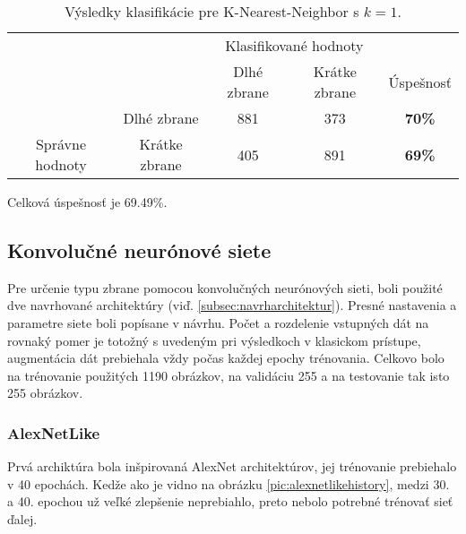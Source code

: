 \begin{table}[H]
    \centering
    \begin{tabular}{ccccc}
                                                                &                                    & \multicolumn{2}{c}{Klasifikované hodnoty}                                                         &                                    \\ \cline{3-5} 
                                                                & \multicolumn{1}{c|}{}              & \multicolumn{1}{c|}{Dlhé zbrane}                & \multicolumn{1}{c|}{Krátke zbrane}              & \multicolumn{1}{c|}{Úspešnosť}     \\ \cline{2-5} 
        \multicolumn{1}{c|}{}                                  & \multicolumn{1}{c|}{Dlhé zbrane}   & \multicolumn{1}{c|}{{\color[HTML]{009901} 881}} & \multicolumn{1}{c|}{{\color[HTML]{9A0000} 373}} & \multicolumn{1}{c|}{\textbf{70\%}} \\ \cline{2-5} 
        \multicolumn{1}{c|}{\multirow{-2}{*}{Správne hodnoty}} & \multicolumn{1}{c|}{Krátke zbrane} & \multicolumn{1}{c|}{{\color[HTML]{9A0000} 405}} & \multicolumn{1}{c|}{{\color[HTML]{009901} 891}} & \multicolumn{1}{c|}{\textbf{69\%}} \\ \cline{2-5} 
    \end{tabular}
    \caption{Výsledky klasifikácie pre K-Nearest-Neighbor s $k=1$.}
    \label{tab:kmeans1}
\end{table}
Celková úspešnosť je 69.49\%.

\subsection{Konvolučné neurónové siete}
Pre určenie typu zbrane pomocou konvolučných neurónových sieti, boli použité dve navrhované architektúry (viď. \ref{subsec:navrharchitektur}).
Presné nastavenia a parametre siete boli popísane v návrhu.
Počet a rozdelenie vstupných dát na rovnaký pomer je totožný s uvedeným pri výsledkoch v klasickom prístupe, augmentácia dát
    prebiehala vždy počas každej epochy trénovania.
Celkovo bolo na trénovanie použitých 1190 obrázkov, na validáciu 255 a na testovanie tak isto 255 obrázkov.

\subsubsection{AlexNetLike}
Prvá archiktúra bola inšpirovaná AlexNet architektúrov, jej trénovanie prebiehalo v 40 epochách.
Kedže ako je vidno na obrázku \ref{pic:alexnetlikehistory}, medzi 30. a 40. epochou už veľké zlepšenie neprebiahlo, preto nebolo potrebné trénovať sieť ďalej.


